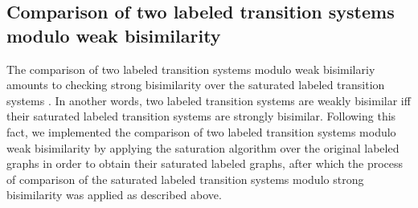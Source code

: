 \subsection{Comparison of two labeled transition systems modulo weak bisimilarity}
The comparison of two labeled transition systems modulo weak bisimilariy amounts to checking strong bisimilarity over the saturated labeled transition systems \cite{ReactiveSystems}. In another words, two labeled transition systems are weakly bisimilar iff their saturated labeled transition systems are strongly bisimilar. Following this fact, we implemented the comparison of two labeled transition systems modulo weak bisimilarity by applying the saturation algorithm over the original labeled graphs in order to obtain their saturated labeled graphs, after which the process of comparison of the saturated labeled transition systems modulo strong bisimilarity was applied as described above.